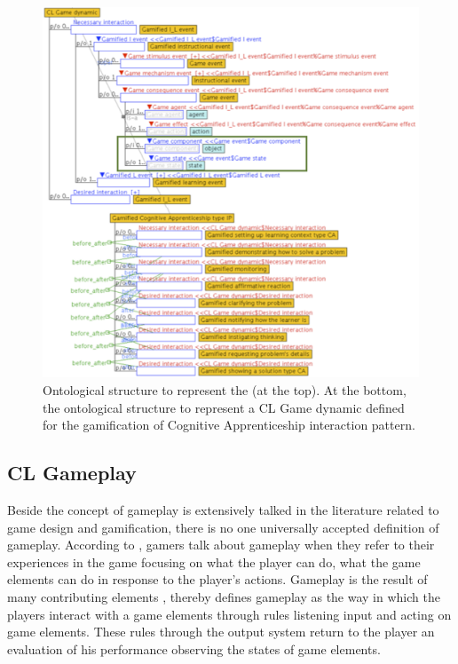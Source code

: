 \begin{figure}[!htbp]
 \caption[Ontological structure to represent a \emph{CL Game dynamic}]{Ontological structure to represent the  (at the top). At the bottom, the ontological structure to represent a CL Game dynamic defined for the gamification of Cognitive Apprenticeship interaction pattern.}
 \label{fig:ontological-structure-cl-game-dynamic}
 \centering
 \includegraphics[width=1\textwidth]{images/chap-ontogacles2/ontological-structure-cl-game-dynamic.png}
 \fautor
\end{figure}

\subsection{CL Gameplay}
\label{subsec:cl-gameplay}

Beside the concept of gameplay is extensively talked in the literature related to game design and gamification, there is no one universally accepted definition of gameplay.
According to , gamers talk about gameplay when they refer to their experiences in the game focusing on what the player can do, what the game elements can do in response to the player's actions.
Gameplay is the result of many contributing elements \cite{RollingsAdams2003}, thereby  defines gameplay as the way in which the players interact with a game elements through rules listening input and acting on game elements.
These rules through the output system return to the player an evaluation of his performance observing the states of game elements. 

